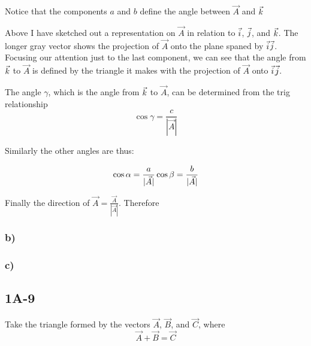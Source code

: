 Notice that the components $a$ and $b$ define the angle between $\vec
{A}$ and $\vec{k}$

Above I have sketched out a representation on $\vec{A}$ in relation 
to {\color{i}$\vec{i}$}, {\color{j}$\vec{j}$}, and {\color{k}$\vec{k}$}. 
The longer gray vector shows the projection of $\vec{A}$ onto the 
plane spaned by {\color{i}$\vec{i}$}{\color{j}$\vec{j}$}.
Focusing our attention just to the last component, we can see that 
the angle from {\color{k}$\vec{k}$} to $\vec{A}$
is defined by the triangle it makes with the projection of $\vec{A}$ 
onto {\color{i}$\vec{i}$}{\color{j}$\vec{j}$}.

The angle $\gamma$, which is the angle from {\color{k}$\vec{k}$} to $\vec{A}$,
can be determined from the trig relationship
\begin{equation*}
\cos{\gamma} = \frac{c}{|\vec{A}|}
\end{equation*}

Similarly the other angles are thus:

\begin{equation*}
\cos{\alpha} = \frac{a}{|\vec{A}|}\\
\cos{\beta} = \frac{b}{|\vec{A}|}
\end{equation*}

Finally the direction of $\vec{A} = \frac{\vec{A}}{|\vec{A}|}$. 
Therefore 

\subsubsection*{b)} 

\subsubsection*{c)} 


\subsection*{1A-9}

Take the triangle formed by the vectors $\vec{A}$, $\vec{B}$, and $
\vec{C}$, where 
\begin{equation*}
\vec{A} + \vec{B} = \vec{C}
\end{equation*}

